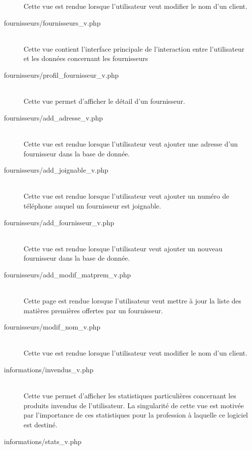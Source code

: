 \begin{description}
                Cette vue est rendue lorsque l'utilisateur veut modifier le
                nom d'un client.
            \item[fournisseurs/fournisseurs\_v.php]\hfill \\  
                Cette vue contient l'interface principale de l'interaction
                entre l'utilisateur et les données concernant les fournisseurs
            \item[fournisseurs/profil\_fournisseur\_v.php]\hfill \\
                Cette vue permet d'afficher le détail d'un fournisseur.
            \item[fournisseurs/add\_adresse\_v.php]\hfill \\      
                Cette vue est rendue lorsque l'utilisateur veut ajouter une
                adresse d'un fournisseur dans la base de donnée.
            \item[fournisseurs/add\_joignable\_v.php]\hfill \\      
                Cette vue est rendue lorsque l'utilisateur veut ajouter un
                numéro de téléphone auquel un fournisseur est joignable.
            \item[fournisseurs/add\_fournisseur\_v.php]\hfill \\  
                Cette vue est rendue lorsque l'utilisateur veut ajouter un
                nouveau fournisseur dans la base de donnée.
            \item[fournisseurs/add\_modif\_matprem\_v.php]\hfill \\  
                Cette page est rendue lorsque l'utilisateur veut mettre à
                jour la liste des matières premières offertes par un
                fournisseur.
            \item[fournisseurs/modif\_nom\_v.php]\hfill \\
                Cette vue est rendue lorsque l'utilisateur veut modifier le
                nom d'un client.
            \item[informations/invendus\_v.php]\hfill \\
                Cette vue permet d'afficher les statistiques particulières
                concernant les produits invendus de l'utilisateur. La
                singularité de cette vue est motivée par l'importance de ces
                statistiques pour la profession à laquelle ce logiciel est
                destiné.
            \item[informations/stats\_v.php]\hfill \\

\end{description}
